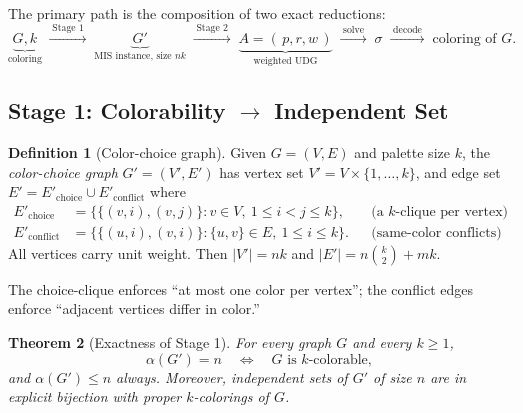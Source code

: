 \documentclass[11pt]{article}
\newtheorem{theorem}{Theorem}[section]
\theoremstyle{definition}
\newtheorem{definition}[theorem]{Definition}
\theoremstyle{remark}
\newcommand{\indep}{\alpha}
\begin{document}
The primary path is the composition of two exact reductions:
\[
  \underbrace{G,k}_{\text{coloring}}
  \;\xrightarrow{\;\text{Stage 1}\;}\;
  \underbrace{G'}_{\text{MIS instance, size }nk}
  \;\xrightarrow{\;\text{Stage 2}\;}\;
  \underbrace{A=(\,p,r,w\,)}_{\text{weighted UDG}}
  \;\xrightarrow{\;\text{solve}\;}\;
  \sigma
  \;\xrightarrow{\;\text{decode}\;}\;
  \text{coloring of }G.
\]

\subsection{Stage 1: Colorability $\to$ Independent Set}
\label{sec:col2is}

\begin{definition}[Color-choice graph]
\label{def:choice}
Given $G=(V,E)$ and palette size $k$, the \emph{color-choice graph}
$G'=(V',E')$ has vertex set $V'=V\times\{1,\dots,k\}$, and edge set $E'=E'_{\mathrm{choice}}\cup E'_{\mathrm{conflict}}$ where
\begin{align*}
  E'_{\mathrm{choice}}   &= \bigl\{\{(v,i),(v,j)\} : v\in V,\ 1\le i<j\le k\bigr\},
   &&\text{(a $k$-clique per vertex)}\\
  E'_{\mathrm{conflict}} &= \bigl\{\{(u,i),(v,i)\} : \{u,v\}\in E,\ 1\le i\le k\bigr\}.
   &&\text{(same-color conflicts)}
\end{align*}
All vertices carry unit weight. Then $|V'|=nk$ and
$|E'|=n\binom{k}{2}+mk$.
\end{definition}

The choice-clique enforces ``at most one color per vertex''; the conflict edges
enforce ``adjacent vertices differ in color.''

\begin{theorem}[Exactness of Stage 1]
\label{thm:col2is}
For every graph $G$ and every $k\ge 1$,
\[
  \indep(G') = n \quad\Longleftrightarrow\quad G \text{ is } k\text{-colorable},
\]
and $\indep(G')\le n$ always. Moreover, independent sets of $G'$ of size $n$ are in
explicit bijection with proper $k$-colorings of $G$.
\end{theorem}
\end{document}
